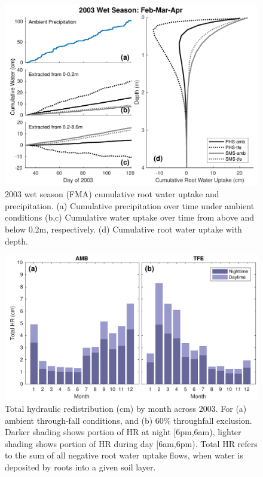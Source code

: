 \documentclass[draft,linenumbers]{agujournal}
\begin{document}
        \clearpage
    \begin{figure}[h]
     \centering
     \includegraphics[width=30pc]{../figs3/qwet.pdf}
     \caption{2003 wet season (FMA) cumulative root water uptake and precipitation. 
     (a) Cumulative precipitation over time under ambient conditions
     (b,c) Cumulative water uptake over time from above and below 0.2m, respectively.
     (d) Cumulative root water uptake with depth.
     }
     \label{fig:qwet}
  \end{figure}
  
    \clearpage
    \begin{figure}[h]
     \centering
     \includegraphics[width=30pc]{../figs3/hr.pdf}
     \caption{Total hydraulic redistribution (cm) by month across 2003. For (a) ambient through-fall conditions, and (b) 60\% throughfall exclusion. 
     Darker shading shows portion of HR at night [6pm,6am), lighter shading shows portion of HR during day [6am,6pm).
     Total HR refers to the sum of all negative root water uptake flows, when water is deposited by roots into a given soil layer.}
     \label{fig:hr}
  \end{figure}
\end{document}
